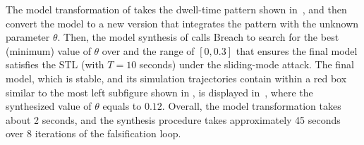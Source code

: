 The model transformation of \toolreaffirm takes the dwell-time pattern shown in~, and then convert the model to a new version that integrates the pattern with the unknown parameter $\theta$.
%
Then, the model synthesis of \toolreaffirm calls Breach to search for the best (\ie minimum) value of $\theta$ over and the range of $[0, 0.3]$ that ensures the final model satisfies the STL  (with $T = 10$ seconds) under the sliding-mode attack. The final model, which is stable, and its simulation trajectories contain within a red box similar to the most left subfigure shown in , is displayed in~, where the synthesized value of $\theta$ equals to $0.12$. Overall, the model transformation takes about 2 seconds, and the synthesis procedure takes approximately 45 seconds over 8 iterations of the falsification loop.





